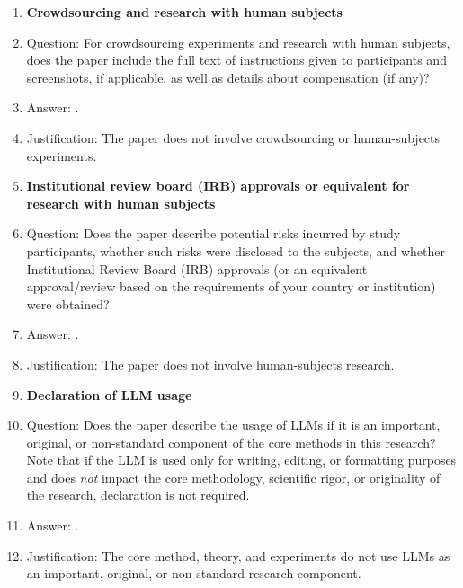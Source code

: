 \begin{enumerate}
\item {\bf Crowdsourcing and research with human subjects}
    \item[] Question: For crowdsourcing experiments and research with human subjects, does the paper include the full text of instructions given to participants and screenshots, if applicable, as well as details about compensation (if any)?
    \item[] Answer: \answerNA{}.
    \item[] Justification: The paper does not involve crowdsourcing or human-subjects experiments.

\item {\bf Institutional review board (IRB) approvals or equivalent for research with human subjects}
    \item[] Question: Does the paper describe potential risks incurred by study participants, whether such risks were disclosed to the subjects, and whether Institutional Review Board (IRB) approvals (or an equivalent approval/review based on the requirements of your country or institution) were obtained?
    \item[] Answer: \answerNA{}.
    \item[] Justification: The paper does not involve human-subjects research.

\item {\bf Declaration of LLM usage}
    \item[] Question: Does the paper describe the usage of LLMs if it is an important, original, or non-standard component of the core methods in this research? Note that if the LLM is used only for writing, editing, or formatting purposes and does \emph{not} impact the core methodology, scientific rigor, or originality of the research, declaration is not required.
    \item[] Answer: \answerNA{}.
    \item[] Justification: The core method, theory, and experiments do not use LLMs as an important, original, or non-standard research component.

\end{enumerate}
